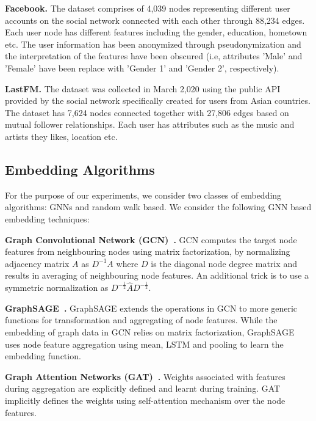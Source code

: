 \noindent\textbf{Facebook.} The dataset comprises of 4,039 nodes representing different user accounts on the social network connected with each other through 88,234 edges.
Each user node has different features including the gender, education, hometown etc.
The user information has been anonymized through pseudonymization and the interpretation of the features have been obscured (i.e, attributes 'Male' and 'Female' have been replace with 'Gender 1' and 'Gender 2', respectively).


\noindent\textbf{LastFM.} The dataset was collected in March 2,020 using the public API provided by the social network specifically created for users from Asian countries.
The dataset has 7,624 nodes connected together with 27,806 edges based on mutual follower relationships.
Each user has attributes such as the music and artists they likes, location etc.


\subsection{Embedding Algorithms}


\noindent For the purpose of our experiments, we consider two classes of embedding algorithms: GNNs and random walk based.
We consider the following GNN based embedding techniques:

\noindent\textbf{Graph Convolutional Network (GCN)~\cite{Kipf2016tc}.} GCN computes the target node features from neighbouring nodes using matrix factorization, by normalizing adjacency matrix $A$ as $D^{-1}A$ where $D$ is the diagonal node degree matrix and results in averaging of neighbouring node features.
An additional trick is to use a symmetric normalization as $D^{-\frac{1}{2}}\hat{A}D^{-\frac{1}{2}}$.

\noindent\textbf{GraphSAGE~\cite{NIPS20176703}.} GraphSAGE extends the operations in GCN to more generic functions for transformation and aggregating of node features.
While the embedding of graph data in GCN relies on matrix factorization, GraphSAGE uses node feature aggregation using mean, LSTM and pooling to learn the embedding function.

\noindent\textbf{Graph Attention Networks (GAT)~\cite{velickovic2018graph}.} %
Weights associated with features during aggregation are explicitly defined and learnt during training.
GAT implicitly defines the weights using self-attention mechanism over the node features.

